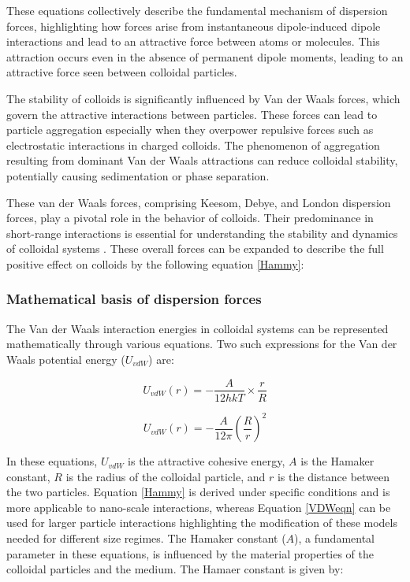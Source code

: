 These equations collectively describe the fundamental mechanism of dispersion forces, highlighting how forces arise from instantaneous dipole-induced dipole interactions and lead to an attractive force between atoms or molecules. This attraction occurs even in the absence of permanent dipole moments, leading to an attractive force seen between colloidal particles.

The stability of colloids is significantly influenced by Van der Waals forces, which govern the attractive interactions between particles. These forces can lead to particle aggregation especially when they overpower repulsive forces such as electrostatic interactions in charged colloids. The phenomenon of aggregation resulting from dominant Van der Waals attractions can reduce colloidal stability, potentially causing sedimentation or phase separation. 

These van der Waals forces, comprising Keesom, Debye, and London dispersion forces, play a pivotal role in the behavior of colloids. Their predominance in short-range interactions is essential for understanding the stability and dynamics of colloidal systems \cite{colloid_review1}\cite{lilBlueBook}\cite{IsGreenBook}\cite{FoundColloidBook}. These overall forces can be expanded to describe the full positive effect on colloids by the following equation \ref{Hammy}: 

\subsubsection{Mathematical basis of dispersion forces} %

The Van der Waals interaction energies in colloidal systems can be represented mathematically through various equations. Two such expressions for the Van der Waals potential energy (\(U_{vdW}\)) are:

\begin{equation}  %
U_{vdW} (r) = - \frac{A}{12hkT} \times \frac{r}{R}
\label{Hammy}
\end{equation}

\begin{equation}
U_{vdW} (r) = - \frac{A}{12\pi} \left( \frac{R}{r}\right)^2
\label{VDWeqn}
\end{equation}


In these equations, \(U_{vdW}\) is the attractive cohesive energy, \(A\) is the Hamaker constant, \(R\) is the radius of the colloidal particle, and \(r\) is the distance between the two particles. Equation \ref{Hammy} is derived under specific conditions and is more applicable to nano-scale interactions, whereas Equation \ref{VDWeqn} can be used for larger particle interactions highlighting the modification of these models needed for different size regimes. The Hamaker constant (\(A\)), a fundamental parameter in these equations, is influenced by the material properties of the colloidal particles and the medium. The Hamaer constant is given by:

